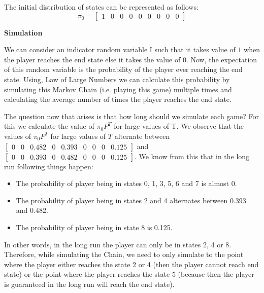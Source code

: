 \documentclass{article}
\begin{document}
\begin{enumerate}
        The initial distribution of states can be represented as follows:
        \begin{equation}
        \nonumber
            \pi_{0} = \begin{bmatrix}
                       1 & 0 & 0 & 0 & 0 & 0 & 0 & 0 & 0
                      \end{bmatrix}
        \end{equation}

        \textbf{Simulation} \par
	
	    \noindent %
        We can consider an indicator random variable I such that it takes value of $1$ when the player reaches the end state else it
        takes the value of $0$. Now, the expectation of this random variable is the probability of the player ever reaching the end state.
        Using, Law of Large Numbers we can calculate this probability by simulating this Markov Chain (i.e. playing this game) multiple
        times and calculating the average number of times the player reaches the end state.\par
	
	    \noindent %
        The question now that arises is that how long should we simulate each game? For this we calculate the value of $\pi_{0}P^{T}$ for
        large values of T. We observe that the values of $\pi_{0}P^{T}$ for large values of $T$ alternate between $\begin{bmatrix} 0 & 0 & 0.482 & 0 & 0.393 & 0 & 0 &
        0 & 0.125 \end{bmatrix}$ and \\ $\begin{bmatrix} 0 & 0 & 0.393 & 0 & 0.482 & 0 & 0 & 0 & 0.125 \end{bmatrix}$. We know 
        from this that in the long run following things happen:
        \begin{itemize}
            \item The probability of player being in states 0, 1, 3, 5, 6 and 7 is almost 0.
            \item The probability of player being in states 2 and 4 alternates between 0.393 and 0.482.
            \item The probability of player being in state 8 is 0.125.
        \end{itemize}
        In other words, in the long run the player can only be in states 2, 4 or 8. Therefore, while simulating the Chain, we need to 
        only simulate to the point where the player either reaches the state 2 or 4 (then the player cannot reach end state) or the 
        point where the player reaches the state 5 (because then the player is guaranteed in the long run will reach the end state). \par
	

\end{enumerate}
\end{document}

